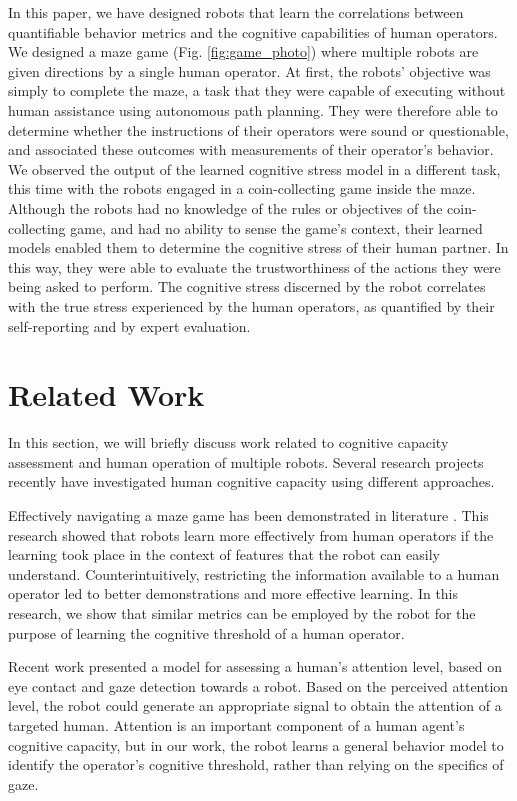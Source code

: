 \documentclass{sig-alternate}
\begin{document}
In this paper, we have designed robots that learn the correlations
between quantifiable behavior metrics and the cognitive capabilities
of human operators.  We designed a maze game
(Fig. \ref{fig:game_photo}) where multiple robots are given directions
by a single human operator.  At first, the robots' objective was
simply to complete the maze, a task that they were capable of
executing without human assistance using autonomous path planning.
They were therefore able to determine whether the instructions of
their operators were sound or questionable, and associated these
outcomes with measurements of their operator's behavior.  We observed
the output of the learned cognitive stress model in a different task,
this time with the robots engaged in a coin-collecting game inside the
maze.  Although the robots had no knowledge of the rules or objectives
of the coin-collecting game, and had no ability to sense the game's
context, their learned models enabled them to determine the cognitive
stress of their human partner.  In this way, they were able to
evaluate the trustworthiness of the actions they were being asked to
perform.  The cognitive stress discerned by the robot correlates with
the true stress experienced by the human operators, as quantified by
their self-reporting and by expert evaluation.

\section{Related Work}
In this section, we will briefly discuss work related to cognitive
capacity assessment and human operation of multiple robots.  Several
research projects recently have investigated human cognitive capacity
using different approaches.

Effectively navigating a maze game has been demonstrated in literature
\cite{crick2011human}.  This research showed that robots learn more
effectively from human operators if the learning took place in the
context of features that the robot can easily understand.
Counterintuitively, restricting the information available to a human
operator led to better demonstrations and more effective learning.  In
this research, we show that similar metrics can be employed by the
robot for the purpose of learning the cognitive threshold of a human
operator.

Recent work \cite{das2013attention,Hoque:2012:ACH:2157689.2157729}
presented a model for assessing a human's attention level, based on
eye contact and gaze detection towards a robot. Based on the perceived
attention level, the robot could generate an appropriate signal to
obtain the attention of a targeted human.  Attention is an important
component of a human agent's cognitive capacity, but in our work, the
robot learns a general behavior model to identify the operator's
cognitive threshold, rather than relying on the specifics of gaze.
\end{document}
